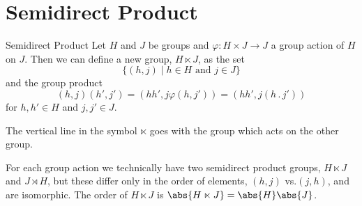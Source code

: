 \documentclass[fleqn]{NotesClass}
\newcommand*{\action}{\mathbin{.}}
\begin{document}
    \section{Semidirect Product}
    \begin{dfn}{Semidirect Product}{}
        Let \(H\) and \(J\) be groups and \(\varphi \colon H \times J \to J\) a group action of \(H\) on \(J\).
        Then we can define a new group, \(H \ltimes J\), as the set
        \begin{equation}
            \{(h, j) \mid h \in H \text{ and } j \in J\}
        \end{equation}
        and the group product
        \begin{equation}
            (h, j)(h', j') = (hh', j\varphi(h, j')) = (hh', j(h\action j'))
        \end{equation}
        for \(h, h' \in H\) and \(j, j' \in J\).
        \begin{rmk}
            The vertical line in the symbol \(\ltimes\) goes with the group which acts on the other group.
        \end{rmk}
    \end{dfn}
    
    For each group action we technically have two semidirect product groups, \(H \ltimes J\) and \(J \rtimes H\), but these differ only in the order of elements, \((h, j)\) vs.\@ \((j, h)\), and are isomorphic.
    The order of \(H \ltimes J\) is \(\abs{H \ltimes J} = \abs{H}\abs{J}\).
    
\end{document}
